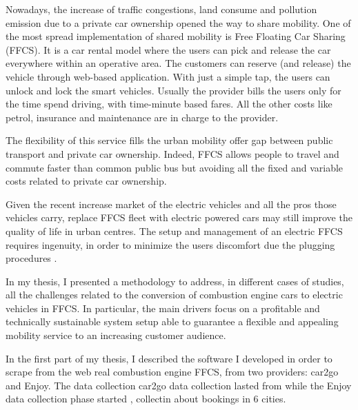 \documentclass[%
   corpo=12pt, %
   oneside, %
   tipotesi=scudo,
   mybibliostyle, %
  numerazioneromana, %
   ]{toptesi}
\newcommand{\mc}[1]{{\color{purple}{[mike: #1]}}}
\begin{document}
\summary%
Nowadays, the increase of traffic congestions, land consume and pollution emission due to a private car ownership opened the way to share mobility. One of the most spread implementation of shared mobility is Free Floating Car Sharing (FFCS). It is a car rental model where the users can pick and release the car everywhere within an operative area. The customers can reserve (and release) the vehicle through web-based application. With just a simple tap, the users can unlock and lock the smart vehicles. Usually the provider bills the users only for the time spend driving, with time-minute based fares. All the other costs like petrol, insurance and maintenance are in charge to the provider. 

The flexibility of this service fills the urban mobility offer gap between public transport and private car ownership. Indeed, FFCS allows people to travel and commute faster than common public bus but avoiding all the fixed and variable costs related to private car ownership.

Given the recent increase market of the electric vehicles and all the pros those vehicles carry, replace FFCS fleet with electric powered cars may still improve the quality of life in urban centres. The setup and management of an electric FFCS requires ingenuity, in order to minimize the users discomfort due the plugging procedures .

In my thesis, I presented a methodology to address, in different cases of studies, all the challenges related to the conversion of combustion engine cars to electric vehicles in FFCS. In particular, the main drivers focus on a profitable and technically sustainable system setup able to guarantee a flexible and appealing mobility service to an increasing customer audience.

In the first part of my thesis, I described the software I developed in order to scrape from the web real combustion engine FFCS, from two providers: car2go and Enjoy. The data collection car2go data collection lasted from \mc{december 2016 to january 2018, collecting more than 28 million users' bookings spread in 25 cities} while the Enjoy data collection phase started \mc{may 2018 and lasted until BOH}, collectin about \mc{BOH} bookings in 6 cities. 
\end{document}
